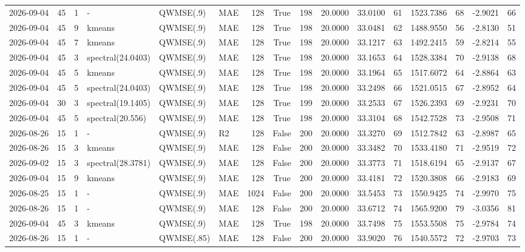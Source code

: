\documentclass[10pt]{article}
\begin{document}
\begin{landscape}
\begin{longtable}{@{}lrrlllrcrrrrrrrr@{}}
2026-09-04 & 45 & 1 & - & QWMSE(.9) & MAE & 128 & True & 198 & 20.0000 & 33.0100 & 61 & 1523.7386 & 68 & -2.9021 & 66 \\
2026-09-04 & 45 & 9 & kmeans & QWMSE(.9) & MAE & 128 & True & 198 & 20.0000 & 33.0481 & 62 & 1488.9550 & 56 & -2.8130 & 51 \\
2026-09-04 & 45 & 7 & kmeans & QWMSE(.9) & MAE & 128 & True & 198 & 20.0000 & 33.1217 & 63 & 1492.2415 & 59 & -2.8214 & 55 \\
2026-09-04 & 45 & 3 & spectral(24.0403) & QWMSE(.9) & MAE & 128 & True & 198 & 20.0000 & 33.1653 & 64 & 1528.3384 & 70 & -2.9138 & 68 \\
2026-09-04 & 45 & 5 & kmeans & QWMSE(.9) & MAE & 128 & True & 198 & 20.0000 & 33.1964 & 65 & 1517.6072 & 64 & -2.8864 & 63 \\
2026-09-04 & 45 & 5 & spectral(24.0403) & QWMSE(.9) & MAE & 128 & True & 198 & 20.0000 & 33.2498 & 66 & 1521.0515 & 67 & -2.8952 & 64 \\
2026-09-04 & 30 & 3 & spectral(19.1405) & QWMSE(.9) & MAE & 128 & True & 199 & 20.0000 & 33.2533 & 67 & 1526.2393 & 69 & -2.9231 & 70 \\
2026-09-04 & 45 & 5 & spectral(20.556) & QWMSE(.9) & MAE & 128 & True & 198 & 20.0000 & 33.3104 & 68 & 1542.7528 & 73 & -2.9508 & 71 \\
2026-08-26 & 15 & 1 & - & QWMSE(.9) & R2 & 128 & False & 200 & 20.0000 & 33.3270 & 69 & 1512.7842 & 63 & -2.8987 & 65 \\
2026-08-26 & 15 & 3 & kmeans & QWMSE(.9) & MAE & 128 & False & 200 & 20.0000 & 33.3482 & 70 & 1533.4180 & 71 & -2.9519 & 72 \\
2026-09-02 & 15 & 3 & spectral(28.3781) & QWMSE(.9) & MAE & 128 & False & 200 & 20.0000 & 33.3773 & 71 & 1518.6194 & 65 & -2.9137 & 67 \\
2026-09-04 & 15 & 9 & kmeans & QWMSE(.9) & MAE & 128 & True & 200 & 20.0000 & 33.4181 & 72 & 1520.3808 & 66 & -2.9183 & 69 \\
2026-08-25 & 15 & 1 & - & QWMSE(.9) & MAE & 1024 & False & 200 & 20.0000 & 33.5453 & 73 & 1550.9425 & 74 & -2.9970 & 75 \\
2026-08-26 & 15 & 1 & - & QWMSE(.9) & MAE & 128 & False & 200 & 20.0000 & 33.6712 & 74 & 1565.9200 & 79 & -3.0356 & 81 \\
2026-09-04 & 45 & 3 & kmeans & QWMSE(.9) & MAE & 128 & True & 198 & 20.0000 & 33.7498 & 75 & 1553.5508 & 75 & -2.9784 & 74 \\
2026-08-26 & 15 & 1 & - & QWMSE(.85) & MAE & 128 & False & 200 & 20.0000 & 33.9020 & 76 & 1540.5572 & 72 & -2.9703 & 73 \\

\end{longtable}
\end{landscape}
\end{document}
